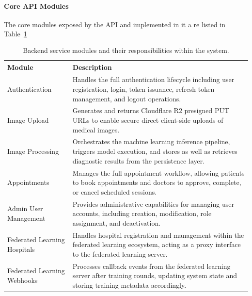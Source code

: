 \paragraph{Core API Modules}
The core modules exposed by the API and implemented in it a re listed in Table~\ref{tab:backend_modules}
\begin{table}[htbp]
	\centering
	\caption{Backend service modules and their responsibilities within the system.}
	\label{tab:backend_modules}
	\begin{tabular}{|p{4cm}|p{9cm}|}
		\hline
		\textbf{Module} & \textbf{Description} \\
		\hline
		
		Authentication &
		Handles the full authentication lifecycle including user registration, login, token issuance, refresh token management, and logout operations. \\
		\hline
		
		Image Upload &
		Generates and returns Cloudflare R2 presigned PUT URLs to enable secure direct client-side uploads of medical images. \\
		\hline
		
		Image Processing &
		Orchestrates the machine learning inference pipeline, triggers model execution, and stores as well as retrieves diagnostic results from the persistence layer. \\
		\hline
		
		Appointments &
		Manages the full appointment workflow, allowing patients to book appointments and doctors to approve, complete, or cancel scheduled sessions. \\
		\hline
		
		Admin User Management &
		Provides administrative capabilities for managing user accounts, including creation, modification, role assignment, and deactivation. \\
		\hline
		
		Federated Learning Hospitals &
		Handles hospital registration and management within the federated learning ecosystem, acting as a proxy interface to the federated learning server. \\
		\hline
		
		Federated Learning Webhooks &
		Processes callback events from the federated learning server after training rounds, updating system state and storing training metadata accordingly. \\
		\hline
		
	\end{tabular}
\end{table}

